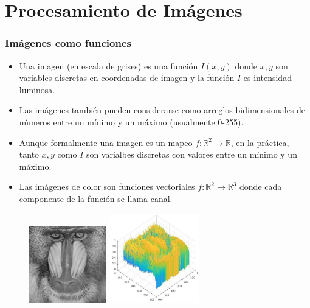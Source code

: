 \section[Proc Imágenes]{Procesamiento de Imágenes}
\begin{frame}\frametitle{Imágenes como funciones}
  \begin{itemize}
  \item Una imagen (en escala de grises) es una función $I(x,y)$ donde $x,y$ son variables discretas en coordenadas de imagen y la función $I$ es intensidad luminosa.
    \item Las imágenes también pueden considerarse como arreglos bidimensionales de números entre un mínimo y un máximo (usualmente 0-255).
    \item Aunque formalmente una imagen es un mapeo $f:\mathbb{R}^2\rightarrow \mathbb{R}$, en la práctica, tanto $x,y$ como $I$ son varialbes discretas con valores entre un mínimo y un máximo.
    \item Las imágenes de color son funciones vectoriales $f:\mathbb{R}^2\rightarrow \mathbb{R}^3$ donde cada componente de la función se llama canal.
  \end{itemize}
  \begin{figure}
    \centering
    \includegraphics[width=0.3\textwidth]{Figures/baboon_grayscale.jpg}
    \includegraphics[width=0.35\textwidth]{Figures/BaboonPlot.jpg}
  \end{figure}
\end{frame}

